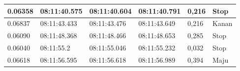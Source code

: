 \begin{longtable}{|l|l|l|l|l|l|}
  0.06358                                                                                                 & 08:11:40.575                                                                                           & 08:11:40.604                                                                                               & 08:11:40.791                                                                                            & 0,216                                              & Stop                                              \\ \hline
  0.06837                                                                                                 & 08:11:43.433                                                                                           & 08:11:43.476                                                                                               & 08:11:43.649                                                                                            & 0,216                                              & Kanan                                             \\ \hline
  0.06090                                                                                                 & 08:11:48.368                                                                                           & 08:11:48.466                                                                                               & 08:11:48.653                                                                                            & 0,285                                              & Stop                                              \\ \hline
  0.06040                                                                                                 & 08:11:55.2                                                                                             & 08:11:55.046                                                                                               & 08:11:55.232                                                                                            & 0,032                                              & Stop                                              \\ \hline
  0.06618                                                                                                 & 08:11:56.595                                                                                           & 08:11:56.618                                                                                               & 08:11:56.989                                                                                            & 0,394                                              & Maju                                              \\ \hline

\end{longtable}
